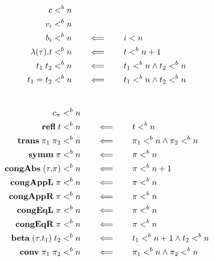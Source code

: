 \documentclass[10pt]{article}
\begin{document}
\begin{mydef}
\begin{align*}
  c <^{b} n\\
  v_i <^{b} n\\
  b_i <^{b} n              & \qquad \Longleftarrow \qquad i < n\\
  \lambda{(\tau)}.{t} <^{b} n  & \qquad \Longleftarrow \qquad t <^{b} n+1\\
  t_1\; t_2 <^{b} n      & \qquad \Longleftarrow \qquad t_1 <^{b} n \land t_2 <^{b} n\\
  t_1 = t_2 <^{b} n        & \qquad \Longleftarrow \qquad t_1 <^{b} n \land t_2 <^{b} n
\end{align*}
\\
\begin{align*}
  c_\pi <^{b} n\\
  \mbox{\bf refl}\; t <^{b} n              & \qquad \Longleftarrow \qquad t <^{b} n\\ 
  \mbox{\bf trans}\;\pi_1\; \pi_2 <^{b} n  & \qquad \Longleftarrow \qquad \pi_1 <^{b} n \land \pi_2 <^{b} n\\
  \mbox{\bf symm}\; \pi <^{b} n            & \qquad \Longleftarrow \qquad \pi <^{b} n\\
  \mbox{\bf congAbs}\;(\tau.\pi) <^{b} n & \qquad \Longleftarrow \qquad \pi <^{b} n+1\\
  \mbox{\bf congAppL}\;\pi <^{b} n        & \qquad \Longleftarrow \qquad \pi <^{b} n\\
  \mbox{\bf congAppR}\;\pi <^{b} n        & \qquad \Longleftarrow \qquad \pi <^{b} n\\
  \mbox{\bf congEqL}\;\pi <^{b} n         & \qquad \Longleftarrow \qquad \pi <^{b} n\\
  \mbox{\bf congEqR}\;\pi <^{b} n         & \qquad \Longleftarrow \qquad \pi <^{b} n\\
  \mbox{\bf beta}\;(\tau.t_1)\; t_2 <^{b} n  & \qquad \Longleftarrow \qquad 
     t_1 <^{b} n+1 \land  t_2 <^{b} n\\
  \mbox{\bf conv}\; \pi_1\; \pi_2 <^{b} n   & \qquad \Longleftarrow \qquad \pi_1 <^{b} n \land  \pi_2 <^{b} n
\end{align*}

\end{mydef}
\end{document}
